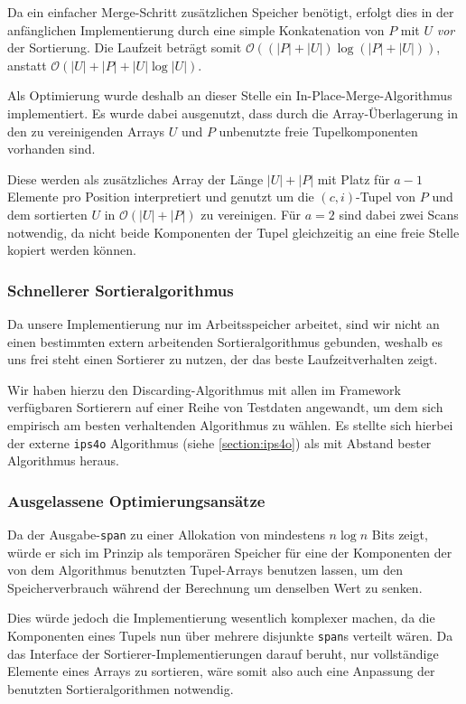 Da ein einfacher Merge-Schritt zusätzlichen Speicher benötigt, erfolgt dies in der anfänglichen Implementierung durch eine simple Konkatenation von $P$ mit $U$ \textit{vor} der Sortierung. Die Laufzeit beträgt somit $\mathcal{O}( (|P| + |U|) \log (|P| + |U|))$, anstatt $\mathcal{O}( |U| + |P| + |U| \log |U|)$.

Als Optimierung wurde deshalb an dieser Stelle ein In-Place-Merge-Algorithmus implementiert. Es wurde dabei ausgenutzt, dass durch die Array-Überlagerung in den zu vereinigenden Arrays $U$ und $P$ unbenutzte freie Tupelkomponenten vorhanden sind.

Diese werden als zusätzliches Array der Länge $|U| + |P|$ mit Platz für $a - 1$ Elemente pro Position interpretiert und genutzt um die $(c, i)$-Tupel von $P$ und dem sortierten $U$ in $\mathcal{O}( |U| + |P|)$ zu vereinigen. Für $a=2$ sind dabei zwei Scans notwendig, da nicht beide Komponenten der Tupel gleichzeitig an eine freie Stelle kopiert werden können.

\subsubsection{Schnellerer Sortieralgorithmus}

Da unsere Implementierung nur im Arbeitsspeicher arbeitet, sind wir nicht an einen bestimmten extern arbeitenden Sortieralgorithmus gebunden, weshalb es uns frei steht einen Sortierer zu nutzen, der das beste Laufzeitverhalten zeigt.

Wir haben hierzu den Discarding-Algorithmus mit allen im Framework verfügbaren Sortierern auf einer Reihe von Testdaten angewandt, um dem sich empirisch am besten verhaltenden Algorithmus zu wählen. Es stellte sich hierbei der externe \texttt{ips4o} Algorithmus (siehe \cref{section:ips4o}) als mit Abstand bester Algorithmus heraus.


\subsubsection{Ausgelassene Optimierungsansätze}

Da der Ausgabe-\texttt{span} zu einer Allokation von mindestens $n \log n$ Bits zeigt, würde er sich im Prinzip als temporären Speicher für eine der Komponenten der von dem Algorithmus benutzten Tupel-Arrays benutzen lassen, um den Speicherverbrauch während der Berechnung um denselben Wert zu senken. 


Dies würde jedoch die Implementierung wesentlich komplexer machen, da die Komponenten eines Tupels nun über mehrere disjunkte \texttt{span}s verteilt wären. Da das Interface der Sortierer-Implementierungen darauf beruht, nur vollständige Elemente eines Arrays zu sortieren, wäre somit also auch eine Anpassung der benutzten Sortieralgorithmen notwendig.
